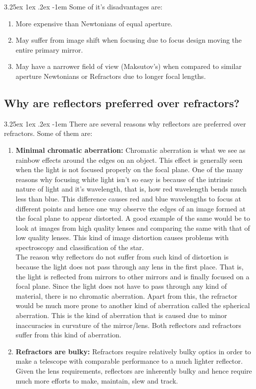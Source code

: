 \documentclass[a4paper,twoside,11pt]{article}
\makeatletter
\numberwithin{equation}{section}
\renewcommand\paragraph{\@startsection{paragraph}{5}{\z@}%
  {3.25ex \@plus1ex \@minus.2ex}%
  {-1em}%
  {\normalfont\normalsize\bfseries}}
\makeatother
\begin{document}
\paragraph{}
Some of it's disadvantages are:
\begin{enumerate}
    \item More expensive than Newtonians of equal aperture. 
    \item May suffer from image shift when focusing due to focus design moving the entire primary mirror. 
    \item May have a narrower field of view (Maksutov's) when compared to similar aperture Newtonians or Refractors due to longer focal lengths.
\end{enumerate}

\subsection{Why are reflectors preferred over refractors?}
\paragraph{}
There are several reasons why reflectors are preferred over refractors. Some of them are: 
\begin{enumerate}
\item {\textbf{Minimal chromatic aberration:} Chromatic aberration is what we see as rainbow effects around the edges on an object. This effect is generally seen when the light is not focused properly on the focal plane. One of the many reasons why focusing white light isn't so easy is because of the intrinsic nature of light and it's wavelength, that is, how red wavelength bends much less than blue. This difference causes red and blue wavelengths to focus at different points and hence one way observe the edges of an image formed at the focal plane to appear distorted. A good example of the same would be to look at images from high quality lenses and comparing the same with that of low quality lenses. This kind of image distortion causes problems with spectroscopy and classification of the star. 
\\ The reason why reflectors do not suffer from such kind of distortion is because the light does not pass through any lens in the first place. That is, the light is reflected from mirrors to other mirrors and is finally focused on a focal plane. Since the light does not have to pass through any kind of material, there is no chromatic aberration. Apart from this, the refractor would be much more prone to another kind of aberration called the spherical aberration. This is the kind of aberration that is caused due to minor inaccuracies in curvature of the mirror/lens. Both reflectors and refractors suffer from this kind of aberration. 
}
\item {\textbf{Refractors are bulky:} Refractors require relatively bulky optics in order to make a telescope with comparable performance to a much lighter reflector. Given the lens requirements, reflectors are inherently bulky and hence require much more efforts to make, maintain, slew and track.
}
\end{enumerate}
\end{document}
